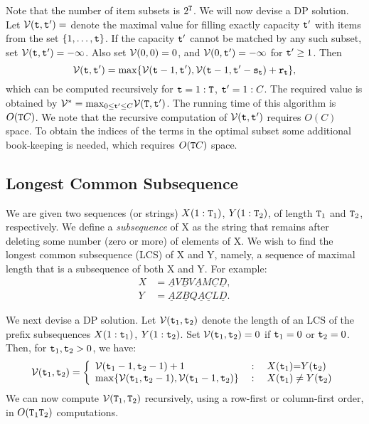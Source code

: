 Note that the number of item subsets is ${2^{\tt T}}$. We will now devise a DP solution.
Let $\mathcal{V}({\tt t},{\tt t}') = $ denote the maximal value for filling exactly capacity ${\tt t}'$ with items from the set $\{1, \ldots,{\tt t}\}$.
If the capacity ${\tt t}'$ cannot be matched by any such subset, set $\mathcal{V}({\tt t},{\tt t}') =  - \infty $.
Also set $\mathcal{V}(0,0) = 0$, and  $\mathcal{V}(0,{\tt t}') =  - \infty $ for ${\tt t}' \ge 1$.  Then
\begin{equation*}
  \mathcal{V}({\tt t},{\tt t}') = \max \{ \mathcal{V}({\tt t} - 1,{\tt t}'), \mathcal{V}({\tt t} - 1,{\tt t}' - {{\tt s}_{{\tt t}}}) + {{\tt r}_{{\tt t}}}\},  
\end{equation*}
which can be computed recursively for ${\tt t} = 1:{\tt T}$,  ${\tt t}' = 1:C$. The required value is obtained by    $\mathcal{V}^* = {\max _{0 \le {\tt t}' \le C}}\mathcal{V}({\tt T},{\tt t}')$.
The running time of this algorithm is $O({\tt T} C)$.  We note that the recursive computation of $\mathcal{V}({\tt t},{\tt t}')$ requires $O(C)$ space. To obtain the indices of the terms in the optimal subset some additional book-keeping is needed, which requires $O({\tt T} C)$  space.

\subsection*{Longest Common Subsequence}\label{ss:LCS}
We are given two sequences (or strings) $X(1:{\tt T}_1)$, $Y(1:{\tt T}_2)$, of length ${\tt T}_1$ and ${\tt T}_2$, respectively. We define a \textit{subsequence} of X as the string that remains after deleting some number (zero or more) of elements of X.  We wish to find the longest common subsequence (LCS) of X and Y, namely, a sequence of maximal length that is a subsequence of both X and Y.
For example:
\begin{equation*}
    \begin{split}
       X &= \underline{A}V\underline{B}V\underline{A}M\underline{C}\underline{D}, \\
       Y &= \underline{A}Z\underline{B}Q\underline{A}\underline{C}L\underline{D}.
     \end{split}
\end{equation*}

We next devise a DP solution.
Let  $\mathcal{V}({\tt t}_1,{\tt t}_2)$ denote the length of an LCS of  the prefix subsequences $X(1:{\tt t}_1)$, $Y(1:{\tt t}_2)$. Set $\mathcal{V}({\tt t}_1,{\tt t}_2) = 0$ if ${\tt t}_1 = 0$ or ${\tt t}_2 = 0$. Then, for ${\tt t}_1,{\tt t}_2 > 0$, we have:
\begin{equation*}
    \Value(\ttime_1,\ttime_2) = \left\{ {\begin{array}{*{20}{l}}
    {\Value(\ttime_1 - 1,\ttime_2 - 1) + 1}&{\;:\quad X(\ttime_1){\rm{ = }}Y(\ttime_2){\rm{  }}}\\
{\max \{ \Value(\ttime_1,\ttime_2 - 1),\Value(\ttime_1 - 1,\ttime_2)\} }&{\;:\quad X(\ttime_1) \ne Y(\ttime_2)}
\end{array}} \right.
\end{equation*}
We can now compute $\mathcal{V}({\tt T}_1, {\tt T}_2)$ recursively, using a row-first or column-first order, in $O({\tt T}_1 {\tt T}_2)$ computations.

